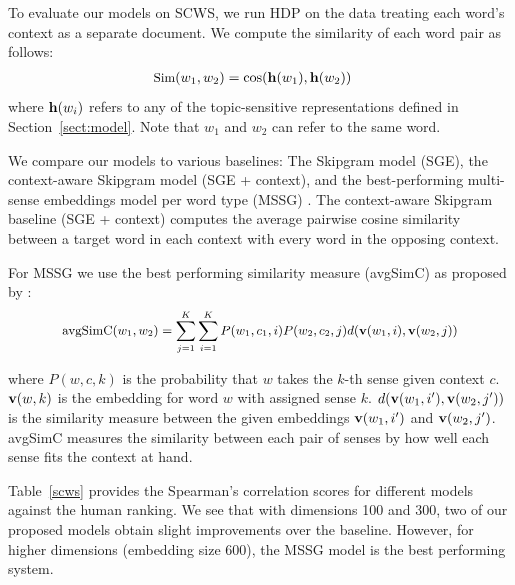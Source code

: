 To evaluate our models on SCWS, we run HDP on the data treating each word's context as a separate document.
We compute the similarity of each word pair as follows:
\begin{align}\small
\text{Sim}(w_1, w_2) &= \cos(\bm{\mathbf{h}}(w_1), \bm{\mathbf{h}}(w_2)) 
\end{align}
where $\bm{\mathbf{h}}(w_i)$ refers to any of the topic-sensitive representations defined in Section~\ref{sect:model}. 
Note that $w_1$ and $w_2$ can refer to the same word.

We compare our models to various baselines: The Skipgram model (SGE), the context-aware Skipgram model (SGE + context), and the best-performing multi-sense embeddings model per word type (MSSG) \citep{neelakantan2014efficient}. 
The context-aware Skipgram baseline (SGE + context) computes the average pairwise cosine similarity between a target word in each context with every word in the opposing context.  

For MSSG we use the best performing similarity measure (avgSimC) as proposed by \citet{neelakantan2014efficient}:
%
\begin{align}\small \label{mssgavgsim}
\text{avgSimC}(w_1, w_2)  = \sum_{j=1}^{K} \sum_{i=1}^{K} P(w_1, c_1, i)P(w_2, c_2, j) d(\bm{\mathbf{v}}(w_1, i), \bm{\mathbf{v}}(w_2, j))
\end{align}

\noindent where $P(w, c, k)$ is the probability that $w$ takes the $k$-th sense given context $c$.
$\bm{\mathbf{v}}(w, k)$ is the embedding for word $w$ with assigned sense $k$.
$d(\bm{\mathbf{v}}(w_1, i'), \bm{\mathbf{v}}(w_2, j'))$ is the similarity measure between the given embeddings $\bm{\mathbf{v}}(w_1, i')$ and $\bm{\mathbf{v}}(w_2, j')$.
avgSimC measures the similarity between each pair of senses by how well each sense fits the context at hand.

Table~\ref{scws} provides the Spearman's correlation scores for different models against the human ranking. 
We see that with dimensions 100 and 300, two of our proposed models obtain slight improvements over the baseline. 
However, for higher dimensions (embedding size 600), the MSSG model is the best performing system. 

